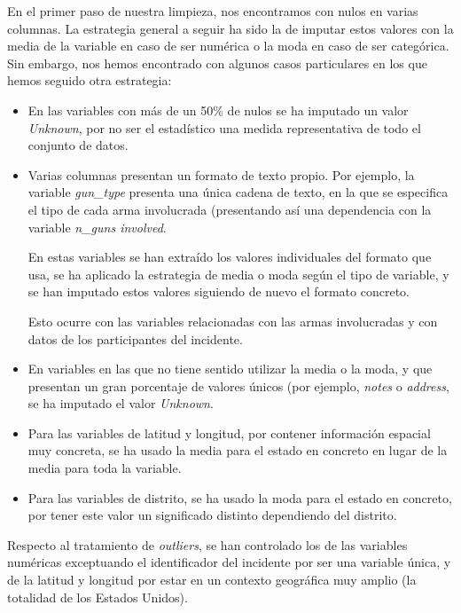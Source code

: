 \documentclass[11pt,a4paper]{article}
\begin{document}
En el primer paso de nuestra limpieza, nos encontramos con nulos en varias columnas. La estrategia general a seguir ha sido la de imputar estos valores con la media de la variable en caso de ser numérica o la moda en caso de ser categórica. Sin embargo, nos hemos encontrado con algunos casos particulares en los que hemos seguido otra estrategia:

\begin{itemize}
    \item En las variables con más de un 50\% de nulos se ha imputado un valor \textit{Unknown}, por no ser el estadístico una medida representativa de todo el conjunto de datos.
    
    \item Varias columnas presentan un formato de texto propio. Por ejemplo, la variable \textit{gun\_type} presenta una única cadena de texto, en la que se especifica el tipo de cada arma involucrada (presentando así una dependencia con la variable \textit{n\_guns involved}.

    En estas variables se han extraído los valores individuales del formato que usa, se ha aplicado la estrategia de media o moda según el tipo de variable, y se han imputado estos valores siguiendo de nuevo el formato concreto.

    Esto ocurre con las variables relacionadas con las armas involucradas y con datos de los participantes del incidente.

    \item En variables en las que no tiene sentido utilizar la media o la moda, y que presentan un gran porcentaje de valores únicos (por ejemplo, \textit{notes} o \textit{address}, se ha imputado el valor \textit{Unknown}.

    \item Para las variables de latitud y longitud, por contener información espacial muy concreta, se ha usado la media para el estado en concreto en lugar de la media para toda la variable.

    \item Para las variables de distrito, se ha usado la moda para el estado en concreto, por tener este valor un significado distinto dependiendo del distrito.
\end{itemize}

Respecto al tratamiento de \textit{outliers}, se han controlado los de las variables numéricas exceptuando el identificador del incidente por ser una variable única, y de la latitud y longitud por estar en un contexto geográfica muy amplio (la totalidad de los Estados Unidos).
\end{document}
